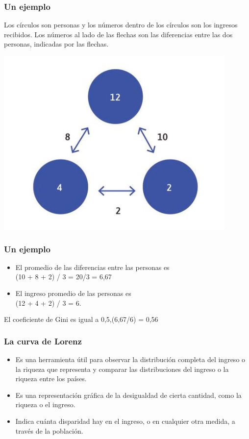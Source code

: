 \documentclass{beamer}
\begin{document}
\begin{frame} 
\frametitle{Un ejemplo}
Los círculos son personas y los números dentro de los círculos son los ingresos recibidos. Los números al lado de las flechas son las diferencias entre las dos personas, indicadas por las flechas.
    \begin{center}    
    \includegraphics[scale=0.6]{Tema_04.15_gini.jpg}
    \end{center}
\end{frame}

\begin{frame} 
\frametitle{Un ejemplo}
\begin{itemize}
    \item El promedio de las diferencias entre las personas es \\ (10 + 8 + 2) / 3 = 20/3 = 6,67 \\ \vspace{3mm}
    \item El ingreso promedio de las personas es \\ (12 + 4 + 2) / 3 = 6.
\end{itemize}
\vspace{3mm}

El coeficiente de Gini es igual a 0,5,(6,67/6) = 0,56
\end{frame}

\begin{frame} 
\frametitle{La curva de Lorenz}
\begin{itemize}
\item Es una herramienta útil para observar la distribución completa del ingreso o la riqueza que representa y comparar las distribuciones del ingreso o la riqueza entre los países.  
\item Es una representación gráfica de la desigualdad de cierta cantidad, como la riqueza o el ingreso.
\item Indica cuánta disparidad hay en el ingreso, o en cualquier otra medida, a través de la población.
\end{itemize}
\end{frame}
\end{document}
